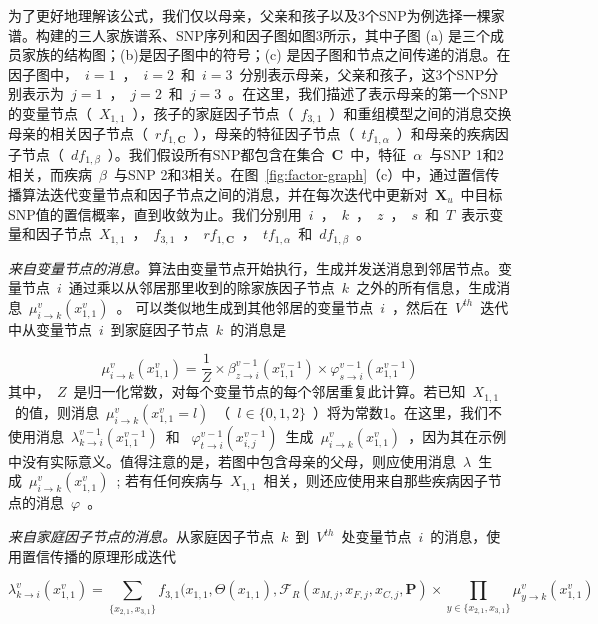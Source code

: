为了更好地理解该公式，我们仅以母亲，父亲和孩子以及3个SNP为例选择一棵家谱。构建的三人家族谱系、SNP序列和因子图如图3所示，其中子图 (a) 是三个成员家族的结构图；(b)是因子图中的符号；(c) 是因子图和节点之间传递的消息。在因子图中，~$i=1$~，~$i=2$~和~$i=3$~分别表示母亲，父亲和孩子，这3个SNP分别表示为~$j=1$~，~$j=2$~和~$j=3$~。在这里，我们描述了表示母亲的第一个SNP的变量节点（~$X_{1,1}$~），孩子的家庭因子节点（~$f_{3,1}$~）和重组模型之间的消息交换母亲的相关因子节点（~$rf_{1,\mathbf{C}}$~），母亲的特征因子节点（~$tf_{1,\alpha}$~）和母亲的疾病因子节点（~$df_{1,\beta}$~）。我们假设所有SNP都包含在集合~$\mathbf{C}$~中，特征~$\alpha$~与SNP 1和2相关，而疾病~$\beta$~与SNP 2和3相关。在图~\ref{fig:factor-graph}（c）中，通过置信传播算法迭代变量节点和因子节点之间的消息，并在每次迭代中更新对~$\mathbf{X}_u$~中目标SNP值的置信概率，直到收敛为止。我们分别用~$i$~，~$k$~，~$z$~，~$s$~和~$T$~表示变量和因子节点~$X_{1,1}$~，~$f_{3,1}$~，~$rf_{1,\mathbf{C}}$~，~$tf_{1,\alpha}$~和~$df_{1,\beta}$~。


\emph{来自变量节点的消息。}算法由变量节点开始执行，生成并发送消息到邻居节点。变量节点~$i$~通过乘以从邻居那里收到的除家族因子节点~$k$~之外的所有信息，生成消息~$\mu_{i \rightarrow k}^v(x_{1,1}^v)$~。 可以类似地生成到其他邻居的变量节点~$i$~，然后在~$V^{th}$~迭代中从变量节点~$i$~到家庭因子节点~$k$~的消息是

\begin{equation}\label{eq:variable-message}
\mu_{i \rightarrow k}^v(x_{1,1}^v)= \frac{1}{Z} \times
\beta_{z \rightarrow i}^{v-1}(x_{1,1}^{v-1}) \times
\varphi_{s \rightarrow i}^{v-1}(x_{1,1}^{v-1})
\end{equation}
其中，~$Z$~是归一化常数，对每个变量节点的每个邻居重复此计算。若已知~$X_{1,1}$~的值，则消息~$\mu_{i \rightarrow k}^v(x_{1,1}^v =l)$~（~$l\in \{0,1,2\}$~）将为常数1。在这里，我们不使用消息~$\lambda_{k \rightarrow i}^{v-1}(x_{1,1}^{v-1})$~和 ~$\varphi_{t \rightarrow i}^{v-1}(x_{i,j}^{v-1})$~生成~$\mu_{i \rightarrow k}^v(x_{1,1}^v)$~，因为其在示例中没有实际意义。值得注意的是，若图中包含母亲的父母，则应使用消息~$\lambda$~生成~$\mu_{i \rightarrow k}^v(x_{1,1}^v)$~; 若有任何疾病与~$X_{1,1}$~相关，则还应使用来自那些疾病因子节点的消息~$\varphi$~。

\emph{来自家庭因子节点的消息。}从家庭因子节点~$k$~到~$V^{th}$~处变量节点~$i$~的消息，使用置信传播的原理形成迭代

\begin{equation}
\label{eq:familial-message}
\lambda_{k \rightarrow i}^v(x_{1,1}^v) =  \sum_{\{x_{2,1},x_{3,1}\}}f_{3,1}(x_{1,1},\Theta(x_{1,1}),\mathcal{F}_{R}(x_{M,j},x_{F,j}, x_{C,j},\mathbf{P}) 
\times \prod_{y\in \{x_{2,1},x_{3,1}\}} \mu_{y \rightarrow k}^v(x_{1,1}^v)
\end{equation}


